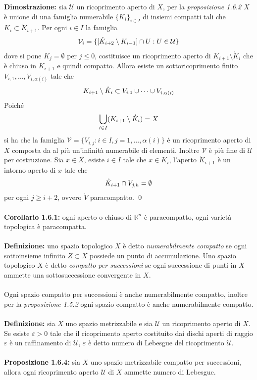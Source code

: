 \documentclass{article}
\begin{document}
\textbf{Dimostrazione:} sia $\mathcal{U}$ un ricoprimento aperto di $X$, per la \textit{proposizione 1.6.2} $X$ è unione di una famiglia numerabile $\{K_i\}_{i \in I}$ di insiemi compatti tali che $K_i \subset \mathring{K}_{i + 1}$. Per ogni $i \in I$ la famiglia 
\begin{align}
    \mathcal{V}_i = \{[\mathring{K}_{i + 2} \setminus K_{i - 1}] \cap U : U \in \mathcal{U}\} \notag
\end{align}
dove si pone $K_j = \emptyset$ per $j \leq 0$, costituisce un ricoprimento aperto di $K_{i + 1} \setminus \mathring{K}_i$ che è chiuso in $K_{i + 1}$ e quindi compatto. Allora esiste un sottoricoprimento finito $V_{i, 1}, \dots, V_{i, \alpha(i)}$ tale che 
\begin{align}
    K_{i + 1} \setminus \mathring{K}_i \subset V_{i, 1} \cup \dots \cup V_{i, \alpha(i)} \notag
\end{align}
Poiché 
\begin{align}
    \bigcup_{i \in I}(K_{i + 1} \setminus \mathring{K}_i) = X \notag
\end{align}
si ha che la famiglia $\mathcal{V} = \{V_{i, j} : i \in I, j = 1, \dots, \alpha(i)\}$ è un ricoprimento aperto di $X$ composta da al più un'infinità numerabile di elementi. Inoltre $\mathcal{V}$ è più fine di $\mathcal{U}$ per costruzione. Sia $x \in X$, esiste $i \in I$ tale che $x \in K_i$, l'aperto $\mathring{K}_{i + 1}$ è un intorno aperto di $x$ tale che 
\begin{align}
    \mathring{K}_{i + 1} \cap V_{j, h} = \emptyset \notag
\end{align}
per ogni $j \geq  i + 2$, ovvero $\mathring{V}$ paracompatto. \qed \\ \\
\textbf{Corollario 1.6.1:} ogni aperto o chiuso di $\mathbb{R}^n$ è paracompatto, ogni varietà topologica è paracompatta. \\ \\
\textbf{Definizione:} uno spazio topologico $X$ è detto \textit{numerabilmente compatto} se ogni sottoinsieme infinito $Z \subset X$ possiede un punto di accumulazione. Uno spazio topologico $X$ è detto \textit{compatto per successioni} se ogni successione di punti in $X$ ammette una sottosuccessione convergente in $X$. \\ \\
Ogni spazio compatto per successioni è anche numerabilmente compatto, inoltre per la \textit{proposizione 1.5.2} ogni spazio compatto è anche numerabilmente compatto. \\ \\
\textbf{Definizione:} sia $X$ uno spazio metrizzabile e sia $\mathcal{U}$ un ricoprimento aperto di $X$. Se esiste $\varepsilon > 0$ tale che il ricoprimento aperto costituito dai dischi aperti di raggio $\varepsilon$ è un raffinamento di $\mathcal{U}$, $\varepsilon$ è detto numero di Lebesgue del ricoprimento $\mathcal{U}$. \\ \\
\textbf{Proposizione 1.6.4:} sia $X$ uno spazio metrizzabile compatto per successioni, allora ogni ricoprimento aperto $\mathcal{U}$ di $X$ ammette numero di Lebesgue. \\
\end{document}
